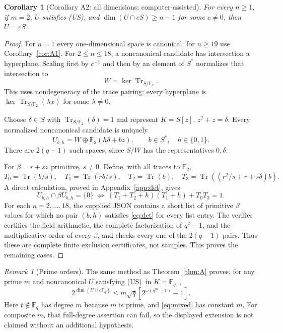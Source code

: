 \documentclass[11pt,a4paper]{article}
\newtheorem{corollary}[theorem]{Corollary}
\theoremstyle{definition}\newtheorem{definition}[theorem]{Definition}
\theoremstyle{remark}\newtheorem{remark}[theorem]{Remark}
\newcommand{\F}{\mathbb F}
\newcommand{\Tr}{\operatorname{Tr}}
\newcommand{\US}{\textup{(US)}}
\numberwithin{equation}{section}
\begin{document}
\begin{corollary}[Corollary A2: all dimensions; computer-assisted]\label{cor:A2}
For every $n\ge1$, if $m=2$, $U$ satisfies \US, and $\dim(U\cap cS)\ge n-1$ for some $c\ne0$, then $U=cS$.
\end{corollary}
\begin{proof}
For $n=1$ every one-dimensional space is canonical; for $n\ge19$ use Corollary~\ref{cor:A1}. For $2\le n\le18$, a noncanonical candidate has intersection a hyperplane. Scaling first by $c^{-1}$ and then by an element of $S^*$ normalizes that intersection to
\[
W=\ker\Tr_{S/\F_2}.
\]
This uses nondegeneracy of the trace pairing: every hyperplane is $\ker\Tr_{S/\F_2}(\lambda x)$ for some $\lambda\ne0$.

Choose $\delta\in S$ with $\Tr_{S/\F_2}(\delta)=1$ and represent $K=S[z]$, $z^2+z=\delta$. Every normalized noncanonical candidate is uniquely
\begin{equation}\label{eq:nearspaces}
U_{b,h}=W\oplus\F_2(h\delta+bz),\qquad b\in S^*,\quad h\in\{0,1\}.
\end{equation}
There are $2(q-1)$ such spaces, since $S/W$ has the representatives $0,\delta$.

For $\beta=r+sz$ primitive, $s\ne0$. Define, with all traces to $\F_2$,
\[
T_0=\Tr(b/s),\quad T_1=\Tr(rb/s),\quad T_2=\Tr(b),\quad
T_3=\Tr((r^2/s+r+s\delta)b).
\]
A direct calculation, proved in Appendix~\ref{app:det}, gives
\begin{equation}\label{eq:det}
U_{b,h}\cap\beta U_{b,h}=\{0\}
\ \Longleftrightarrow\
(T_1+T_2+h)(T_1+h)+T_0T_3=1.
\end{equation}
For each $n=2,\ldots,18$, the supplied JSON contains a short list of primitive $\beta$ values for which no pair $(b,h)$ satisfies \eqref{eq:det} for every list entry. The verifier certifies the field arithmetic, the complete factorization of $q^2-1$, and the multiplicative order of every $\beta$, and checks every one of the $2(q-1)$ pairs. Thus these are complete finite exclusion certificates, not samples. This proves the remaining cases.
\end{proof}

\begin{remark}[Prime orders]
The same method as Theorem~\ref{thm:A} proves, for any prime $m$ and noncanonical $U$ satisfying \US\ in $K=\F_{q^m}$,
\[
2^{\dim(U\cap c\F_q)}\le m\sqrt q[2^{\omega(q^m-1)}-1].
\]
Here $t\notin\F_q$ has degree $m$ because $m$ is prime, and \eqref{eq:mixed} has constant $m$. For composite $m$, that full-degree assertion can fail, so the displayed extension is not claimed without an additional hypothesis.
\end{remark}
\end{document}
